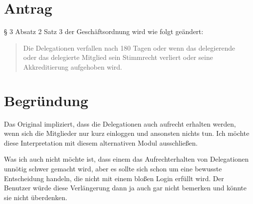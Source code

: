 \section{Antrag}

§ 3 Absatz 2 Satz 3 der Geschäftsordnung wird wie folgt geändert:

\begin{quote}
Die Delegationen verfallen nach 180 Tagen oder wenn das delegierende oder das delegierte Mitglied sein Stimmrecht verliert oder seine Akkreditierung aufgehoben wird.

\end{quote}
\section{Begründung}

Das Original impliziert, dass die Delegationen auch aufrecht erhalten werden, wenn sich die Mitglieder nur kurz einloggen und ansonsten nichts tun. Ich möchte diese Interpretation mit diesem alternativen Modul ausschließen.

Was ich auch nicht möchte ist, dass einem das Aufrechterhalten von Delegationen unnötig schwer gemacht wird, aber es sollte sich schon um eine bewusste Entscheidung handeln, die nicht mit einem bloßen Login erfüllt wird. Der Benutzer würde diese Verlängerung dann ja auch gar nicht bemerken und könnte sie nicht überdenken.
